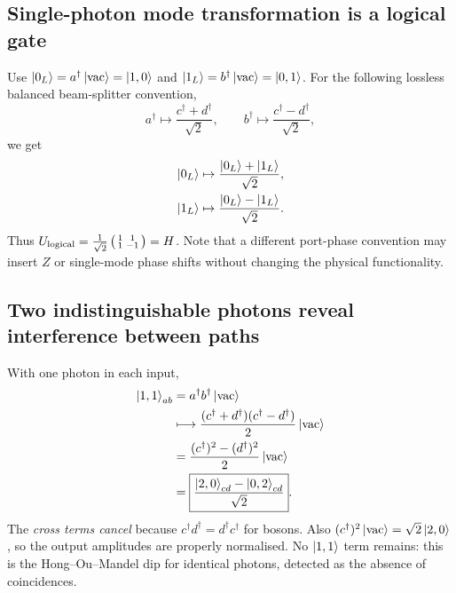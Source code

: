 \subsection{Single-photon mode transformation is a logical gate}
Use $\left\lvert 0_L\right\rangle=a^\dagger\left\lvert \mathrm{vac}\right\rangle=\left\lvert 1,0\right\rangle$ and $\left\lvert 1_L\right\rangle=b^\dagger\left\lvert \mathrm{vac}\right\rangle=\left\lvert 0,1\right\rangle$. For the following lossless balanced beam-splitter convention,
\begin{equation}\label{eq:bstwo}
a^\dagger\mapsto\frac{c^\dagger+d^\dagger}{\sqrt2},\qquad
b^\dagger\mapsto\frac{c^\dagger-d^\dagger}{\sqrt2},
\end{equation}
we get
\begin{align}
\left\lvert 0_L\right\rangle&\mapsto\frac{\left\lvert 0_L\right\rangle+\left\lvert 1_L\right\rangle}{\sqrt2},\\
\left\lvert 1_L\right\rangle&\mapsto\frac{\left\lvert 0_L\right\rangle-\left\lvert 1_L\right\rangle}{\sqrt2}.
\end{align}
Thus $U_{\rm logical}=\frac1{\sqrt2}\left(\begin{smallmatrix}1&1\\1&-1\end{smallmatrix}\right)=H$. Note that a different port-phase convention may insert $Z$ or single-mode phase shifts without changing the physical functionality.

\subsection{Two indistinguishable photons reveal interference between paths}
With one photon in each input, 
\begin{align}
\left\lvert 1,1\right\rangle_{ab}&=a^\dagger b^\dagger\left\lvert \mathrm{vac}\right\rangle\\
&\longmapsto\frac{(c^\dagger+d^\dagger)(c^\dagger-d^\dagger)}2\left\lvert \mathrm{vac}\right\rangle\\
&=\frac{(c^\dagger)^2-(d^\dagger)^2}{2}\left\lvert \mathrm{vac}\right\rangle\\
&=\boxed{\frac{\left\lvert 2,0\right\rangle_{cd}-\left\lvert 0,2\right\rangle_{cd}}{\sqrt2}}.
\end{align}
The \emph{cross terms cancel} because $c^\dagger d^\dagger=d^\dagger c^\dagger$ for bosons. Also $(c^\dagger)^2\left\lvert \mathrm{vac}\right\rangle=\sqrt2\left\lvert 2,0\right\rangle$, so the output amplitudes are properly normalised. No $\left\lvert 1,1\right\rangle$ term remains: this is the Hong--Ou--Mandel dip for identical photons, detected as the absence of coincidences.

